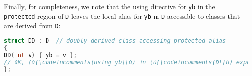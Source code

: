 \noindent Finally, for completeness, we note that the using directive for
\texttt{yb} in the \texttt{protected} region of \texttt{D} leaves the
local alias for \texttt{yb} in \texttt{D} accessible to classes that are
derived from \texttt{D}:

\begin{lstlisting}[language=C++]
struct DD : D  // doubly derived class accessing protected alias
{
DD(int v) { yb = v };
// OK, (ù{\codeincomments{using yb}}ù) in (ù{\codeincomments{D}}ù) exposes (ù{\codeincomments{protected}}ù) alias; assigns (17).
};
\end{lstlisting}



